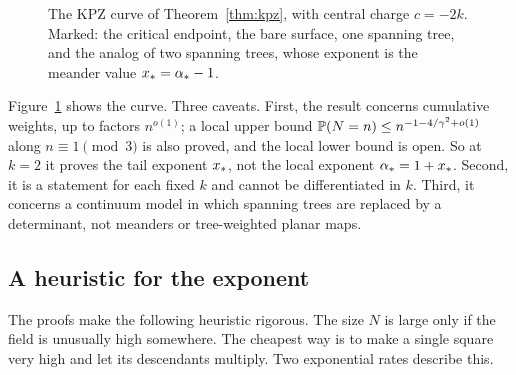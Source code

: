 \begin{figure}[b]
\centering
{}
\caption{The KPZ curve of Theorem~\ref{thm:kpz}, with central charge $c=-2k$. Marked: the
critical endpoint, the bare surface, one spanning tree, and the analog of two spanning trees,
whose exponent is the meander value $x_*=\alpha_*-1$.}
\label{fig:kpz}
\end{figure}

Figure~\ref{fig:kpz} shows the curve. Three caveats. First, the result concerns cumulative weights,
up to factors $n^{o(1)}$; a local upper bound $\mathbb{P}(N=n)\le n^{-1-4/\gamma^2+o(1)}$ along
$n\equiv1\pmod3$ is also proved, and the local lower bound is open. So at $k=2$ it proves the
tail exponent $x_*$, not the local exponent $\alpha_*=1+x_*$. Second, it is a statement for
each fixed $k$ and cannot be differentiated in $k$. Third, it concerns a continuum model in which
spanning trees are replaced by a determinant, not meanders or tree-weighted planar maps.

\subsection{A heuristic for the exponent}\label{sec:heuristic}

The proofs make the following heuristic rigorous. The size $N$ is large only if the field is
unusually high somewhere. The cheapest way is to make a single square very high and let its
descendants multiply. Two exponential rates describe this.


